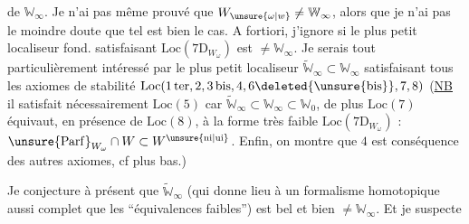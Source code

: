  de $\mathbb W_\infty$. Je n'ai pas même prouvé que $W_{\unsure{\omega|w}}\ne\mathbb W_\infty$, alors que je n'ai pas le moindre doute que tel est bien le cas. A fortiori, j'ignore si le plus petit localiseur fond. satisfaisant $\mathrm{Loc}(7\mathrm{D}_{W_\omega})$\deleted{\unsure{,}} est $\ne\mathbb W_\infty$. Je serais tout particulièrement intéressé par le plus petit localiseur $\widetilde{\mathbb W}_\infty\subset\mathbb W_\infty$ satisfaisant tous les axiomes de stabilité $\mathrm{Loc}(1\,\mathrm{ter},2,3\,\mathrm{bis},4,6\deleted{\unsure{\mathrm{bis}}},7,8)$ (\uline{NB} il satisfait nécessairement $\mathrm{Loc}(5)$ car $\widetilde{\mathbb W}_\infty\subset\mathbb W_\infty\subset\mathbb W_0$\deleted{\unsure{)}}, de plus $\mathrm{Loc}(7)$ équivaut, en présence de $\mathrm{Loc}(8)$, à la forme très faible $\mathrm{Loc}(7\mathrm{D}_{W_\omega})$ : $\unsure{\mathrm{Parf}}_{W_\omega}\cap W\subset W^{\unsure{\mathrm{ni}|\mathrm{ui}}}$. Enfin, on montre que $4$ est conséquence des autres axiomes, cf plus bas.)

Je conjecture à présent que $\widetilde{\mathbb W}_\infty$ (qui donne lieu à un formalisme homotopique  aussi complet que  les  ``équivalences faibles'') est bel et bien $\ne\mathbb W_\infty$. Et je suspecte
